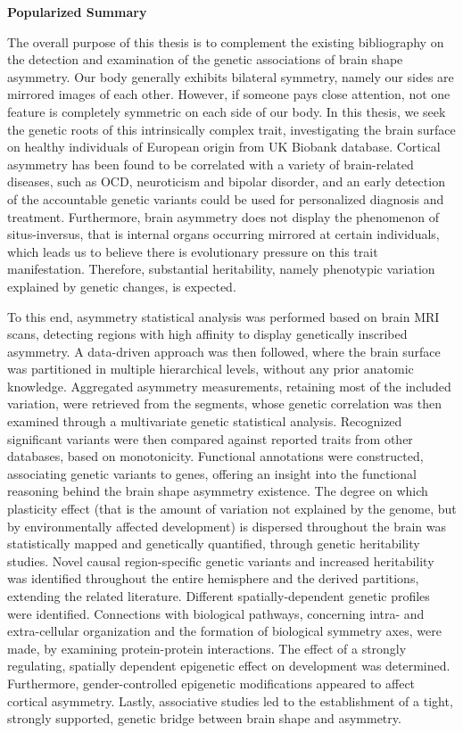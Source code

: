 
\newenvironment{popsum}%
{\cleardoublepage\thispagestyle{empty}\null\vfill\begin{center}%
		\bfseries Popularized Summary\end{center}}%
{\vfill\null}
\begin{popsum}
The overall purpose of this thesis is to complement the existing bibliography on the detection and examination of the genetic associations of brain shape asymmetry.  Our body generally exhibits bilateral symmetry, namely our sides are mirrored images of each other. However, if someone pays close attention, not one feature is completely symmetric on each side of our body. In this thesis, we seek the genetic roots of this intrinsically complex trait, investigating the brain surface on healthy individuals of European origin from UK Biobank database. Cortical asymmetry has been found to be correlated with a variety of brain-related diseases, such as OCD, neuroticism and bipolar disorder,  and an early detection of the accountable genetic variants could be used for personalized diagnosis and treatment. Furthermore, brain asymmetry does not display the phenomenon of situs-inversus, that is internal organs occurring mirrored at certain individuals, which leads us to believe there is evolutionary pressure on this trait manifestation. Therefore, substantial heritability, namely phenotypic variation explained by genetic changes, is expected.

To this end, asymmetry statistical analysis was performed based on brain MRI scans, detecting regions with high affinity to display genetically inscribed asymmetry. A data-driven approach was then followed, where the brain surface was partitioned in multiple hierarchical levels, without any prior anatomic knowledge. Aggregated asymmetry measurements, retaining most of the included variation, were retrieved from the segments, whose genetic correlation was then examined through a multivariate genetic statistical analysis. Recognized significant variants were then compared against reported traits from other databases, based on monotonicity.  Functional annotations were constructed,  associating genetic variants to genes, offering an insight into the functional reasoning behind the brain shape asymmetry existence. The degree on which plasticity effect (that is the amount of variation not explained by the genome, but by  environmentally affected development) is dispersed throughout the brain was statistically mapped and genetically quantified, through genetic heritability studies. Novel causal region-specific genetic variants and increased heritability was identified throughout the entire hemisphere and the derived partitions, extending the related literature. Different spatially-dependent genetic profiles were identified. Connections with biological pathways, concerning intra- and extra-cellular organization and the formation of biological symmetry axes, were made, by examining protein-protein interactions. The effect of a strongly regulating, spatially dependent epigenetic effect on development was determined. Furthermore, gender-controlled epigenetic modifications appeared to affect cortical asymmetry. Lastly, associative studies led to the establishment of a tight, strongly supported, genetic bridge between  brain shape and asymmetry.
\end{popsum}